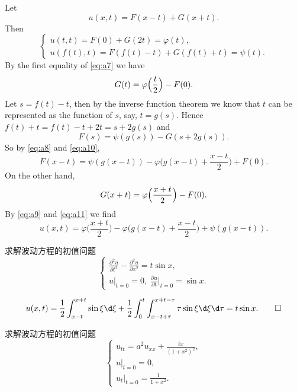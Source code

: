 \begin{solution}
  Let
  \[ u(x,t) = F(x-t) + G(x+t). \]
  Then
  \begin{equation}\label{eq:a7}
    \begin{cases}
      u(t,t) = F(0) + G(2t) = \varphi(t), \\
      u(f(t),t) = F(f(t)-t) + G(f(t)+t) = \psi(t).
    \end{cases}
  \end{equation}
  By the first equality of \eqref{eq:a7} we have
  \begin{equation}\label{eq:a10}
    G(t) = \varphi\Bigl(\frac{t}{2}\Bigr) - F(0).
  \end{equation}
  Let $s = f(t) - t$, then by the inverse function theorem we know that
  $t$ can be represented as the function of $s$, say, $t = g(s)$.
  Hence $f(t)+t = f(t)-t+2t = s + 2g(s)$ and 
  \begin{equation}\label{eq:a8}
    F(s) = \psi(g(s)) - G(s+2g(s)).
  \end{equation}
  So by \eqref{eq:a8} and \eqref{eq:a10},
  \begin{equation}\label{eq:a9}
    F(x-t) = \psi(g(x-t)) - \varphi\biggl(g(x-t) + \frac{x-t}{2}\biggr) + F(0).
  \end{equation}
  On the other hand,
  \begin{equation}\label{eq:a11}
    G(x+t) = \varphi\Bigl(\frac{x+t}{2}\Bigr) - F(0).
  \end{equation}
  By \eqref{eq:a9} and \eqref{eq:a11} we find
  \[\boxed{u(x,t) = \varphi\biggl(\frac{x+t}{2}\biggr)
    - \varphi\biggl(g(x-t) + \frac{x-t}{2}\biggr) + \psi(g(x-t)).}\]
\end{solution}


\begin{exercise}[8]
  求解波动方程的初值问题
  \[
    \begin{cases}
      \frac{\partial^2u}{\partial t^2} - \frac{\partial^2u}{\partial x^2} = t\sin x, \\
      u|_{t=0} = 0,\; \frac{\partial u}{\partial t}\Big|_{t=0} = \sin x.
    \end{cases}
  \]
\end{exercise}

\begin{solve}
  \[u(x,t) = \frac{1}{2}\int_{x-t}^{x+t}\sin \xi\d\xi
      + \frac{1}{2}\int_0^t\int_{x-t+\tau}^{x+t-\tau}\tau\sin \xi\d\xi\d\tau 
      = t\sin x.\qedhere\]
\end{solve}


\begin{exercise}[9]
  求解波动方程的初值问题
  \[\begin{cases}
    u_{tt} = a^2u_{xx} + \frac{tx}{(1+x^2)^2}, \\
    u|_{t=0} = 0, \\
    u_t|_{t=0} = \frac{1}{1+x^2}.
  \end{cases}\]  
\end{exercise}


